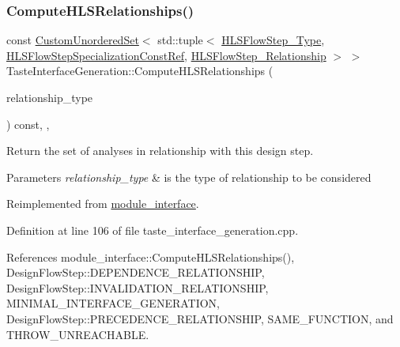 \subsubsection{\texorpdfstring{Compute\+H\+L\+S\+Relationships()}{ComputeHLSRelationships()}}
{\footnotesize\ttfamily const \hyperlink{classCustomUnorderedSet}{Custom\+Unordered\+Set}$<$ std\+::tuple$<$ \hyperlink{hls__step_8hpp_ada16bc22905016180e26fc7e39537f8d}{H\+L\+S\+Flow\+Step\+\_\+\+Type}, \hyperlink{hls__step_8hpp_a5fdd2edf290c196531d21d68e13f0e74}{H\+L\+S\+Flow\+Step\+Specialization\+Const\+Ref}, \hyperlink{hls__step_8hpp_a3ad360b9b11e6bf0683d5562a0ceb169}{H\+L\+S\+Flow\+Step\+\_\+\+Relationship} $>$ $>$ Taste\+Interface\+Generation\+::\+Compute\+H\+L\+S\+Relationships (\begin{DoxyParamCaption}\item[{const \hyperlink{classDesignFlowStep_a723a3baf19ff2ceb77bc13e099d0b1b7}{Design\+Flow\+Step\+::\+Relationship\+Type}}]{relationship\+\_\+type }\end{DoxyParamCaption}) const\hspace{0.3cm}{\ttfamily [override]}, {\ttfamily [protected]}, {\ttfamily [virtual]}}



Return the set of analyses in relationship with this design step. 


\begin{DoxyParams}{Parameters}
{\em relationship\+\_\+type} & is the type of relationship to be considered \\
\hline
\end{DoxyParams}


Reimplemented from \hyperlink{classmodule__interface_a48a74ac615057c46e4bc09b05b644e73}{module\+\_\+interface}.



Definition at line 106 of file taste\+\_\+interface\+\_\+generation.\+cpp.



References module\+\_\+interface\+::\+Compute\+H\+L\+S\+Relationships(), Design\+Flow\+Step\+::\+D\+E\+P\+E\+N\+D\+E\+N\+C\+E\+\_\+\+R\+E\+L\+A\+T\+I\+O\+N\+S\+H\+IP, Design\+Flow\+Step\+::\+I\+N\+V\+A\+L\+I\+D\+A\+T\+I\+O\+N\+\_\+\+R\+E\+L\+A\+T\+I\+O\+N\+S\+H\+IP, M\+I\+N\+I\+M\+A\+L\+\_\+\+I\+N\+T\+E\+R\+F\+A\+C\+E\+\_\+\+G\+E\+N\+E\+R\+A\+T\+I\+ON, Design\+Flow\+Step\+::\+P\+R\+E\+C\+E\+D\+E\+N\+C\+E\+\_\+\+R\+E\+L\+A\+T\+I\+O\+N\+S\+H\+IP, S\+A\+M\+E\+\_\+\+F\+U\+N\+C\+T\+I\+ON, and T\+H\+R\+O\+W\+\_\+\+U\+N\+R\+E\+A\+C\+H\+A\+B\+LE.

